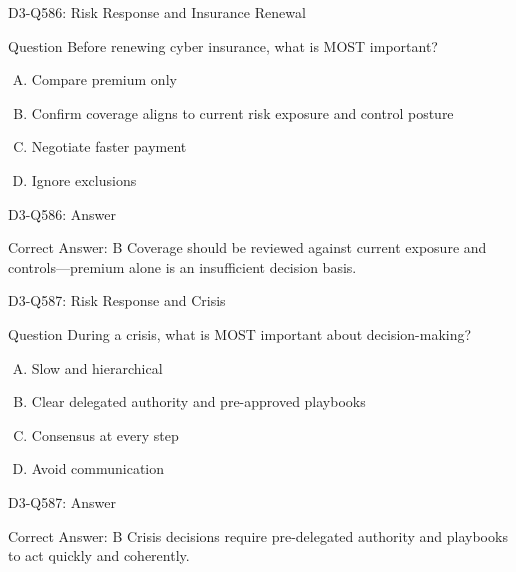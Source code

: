\documentclass{beamer}
\begin{document}
	\begin{frame}{D3-Q586: Risk Response and Insurance Renewal}
		\begin{block}{Question}
			Before renewing cyber insurance, what is MOST important?
		\end{block}
		\begin{enumerate}[(A)]
			\item Compare premium only
			\item Confirm coverage aligns to current risk exposure and control posture
			\item Negotiate faster payment
			\item Ignore exclusions
		\end{enumerate}
	\end{frame}
	\begin{frame}{D3-Q586: Answer}
		\begin{block}{Correct Answer: B}
			Coverage should be reviewed against current exposure and controls—premium alone is an insufficient decision basis.
		\end{block}
	\end{frame}
	
	\begin{frame}{D3-Q587: Risk Response and Crisis}
		\begin{block}{Question}
			During a crisis, what is MOST important about decision-making?
		\end{block}
		\begin{enumerate}[(A)]
			\item Slow and hierarchical
			\item Clear delegated authority and pre-approved playbooks
			\item Consensus at every step
			\item Avoid communication
		\end{enumerate}
	\end{frame}
	\begin{frame}{D3-Q587: Answer}
		\begin{block}{Correct Answer: B}
			Crisis decisions require pre-delegated authority and playbooks to act quickly and coherently.
		\end{block}
	\end{frame}
	
\end{document}

